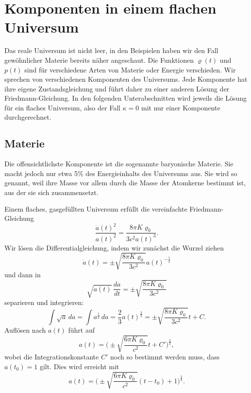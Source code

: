 %

\section{Komponenten in einem flachen Universum}
Das reale Universum ist nicht leer, in den Beispielen haben wir den
Fall gewöhnlicher Materie bereits näher angeschaut.
Die Funktionen $\varrho(t)$ und $p(t)$ sind für verschiedene
Arten von Materie oder Energie verschieden.
Wir sprechen von verschiedenen Komponenten des Universums.
Jede Komponente hat ihre eigene Zustandsgleichung und führt
daher zu einer anderen Lösung der Friedmann-Gleichung.
In den folgenden Unterabschnitten wird jeweils die Lösung für
ein flaches Universum, also der Fall $\kappa=0$ mit nur einer
Komponente durchgerechnet.


\subsection{Materie}
Die offensichtlichste Komponente ist die sogenannte baryonische Materie.
Sie macht jedoch nur etwa 5\% des Energieinhalts des Universums aus.
Sie wird so genannt, weil ihre Masse vor allem durch die Masse der Atomkerne
bestimmt ist, aus der sie sich zusammensetzt.

Einem flaches, gasgefüllten Universum 
erfüllt die vereinfachte Friedmann-Gleichung
\[
\frac{\dot a(t)^2}{a(t)^2}
=
\frac{8\pi K\varrho_0}{3c^2 a(t)^3}.
\]
Wir lösen die Differentialgleichung, indem wir zunächst die Wurzel ziehen 
\[
\dot a(t)=\pm \sqrt{
\frac{8\pi K\varrho_0}{3c^2}
}a(t)^{-\frac{1}{2}}
\]
und dann in
\[
\sqrt{a(t)}\,
\frac{da}{dt}
=
\pm\sqrt{\frac{8\pi K\varrho_0}{3c^2}}
\]
separieren und integrieren:
\[
\int \sqrt{a}\,da
=
\int a^\frac12\,da
=
\frac23 a(t)^\frac{3}{2}
=
\pm\sqrt{\frac{8\pi K\varrho_0}{3c^2}}t + C.
\]
Auflösen nach $a(t)$ führt auf
\[
a(t)=\biggl(\pm\sqrt{\frac{6\pi K\varrho_0}{c^2}}t+C'\biggr)^{\frac23},
\]
wobei die Integrationskonstante $C'$ noch so bestimmt werden muss,
dass $a(t_0)=1$ gilt.
Dies wird erreicht mit
\begin{equation}
a(t)
=
\biggl(\pm\sqrt{\frac{6\pi K\varrho_0}{c^2}}(t-t_0) + 1\biggr)^\frac23.
\label{skript:friedmann:alter:materie}
\end{equation}

